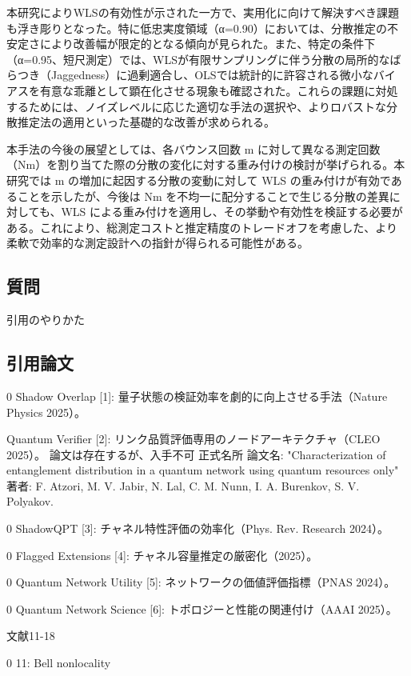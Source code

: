 \documentclass[conference]{IEEEtran}
\begin{document}
本研究によりWLSの有効性が示された一方で、実用化に向けて解決すべき課題
も浮き彫りとなった。特に低忠実度領域（α=0.90）においては、分散推定の不
安定さにより改善幅が限定的となる傾向が見られた。また、特定の条件下
（α=0.95、短尺測定）では、WLSが有限サンプリングに伴う分散の局所的なば
らつき（Jaggedness）に過剰適合し、OLSでは統計的に許容される微小なバイ
アスを有意な乖離として顕在化させる現象も確認された。これらの課題に対処
するためには、ノイズレベルに応じた適切な手法の選択や、よりロバストな分
散推定法の適用といった基礎的な改善が求められる。


本手法の今後の展望としては、各バウンス回数 m に対して異なる測定回数
（Nm​）を割り当てた際の分散の変化に対する重み付けの検討が挙げられる。本
研究では m の増加に起因する分散の変動に対して WLS の重み付けが有効であ
ることを示したが、今後は Nm​ を不均一に配分することで生じる分散の差異に
対しても、WLS による重み付けを適用し、その挙動や有効性を検証する必要が
ある。これにより、総測定コストと推定精度のトレードオフを考慮した、より
柔軟で効率的な測定設計への指針が得られる可能性がある。

\subsection*{質問}
\label{sec:org978a9b2}
引用のやりかた

\subsection*{引用論文}
\label{sec:orgde36cad}

0 Shadow Overlap [1]: 量子状態の検証効率を劇的に向上させる手法（Nature Physics 2025）。

Quantum Verifier [2]: リンク品質評価専用のノードアーキテクチャ（CLEO 2025）。
論文は存在するが、入手不可
正式名所
    論文名: "Characterization of entanglement distribution in a quantum network using quantum resources only"
    著者: F. Atzori, M. V. Jabir, N. Lal, C. M. Nunn, I. A. Burenkov, S. V. Polyakov.


0 ShadowQPT [3]: チャネル特性評価の効率化（Phys. Rev. Research 2024）。

0 Flagged Extensions [4]: チャネル容量推定の厳密化（2025）。

0 Quantum Network Utility [5]: ネットワークの価値評価指標（PNAS 2024）。

0 Quantum Network Science [6]: トポロジーと性能の関連付け（AAAI 2025）。

文献11-18

0 11: Bell nonlocality
\end{document}
